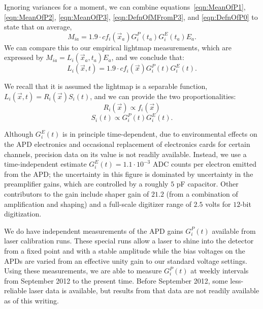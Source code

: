 Ignoring variances for a moment, we can combine equations~\ref{eqn:MeanOfP1}, \ref{eqn:MeanOfP2}, \ref{eqn:MeanOfP3}, \ref{eqn:DefnOfMFromP3}, and \ref{eqn:DefnOfP0} to state that on average,
\[M_{ia} = 1.9 \cdot c f_i(\vec{x}_a) G^P_i(t_a) G^E_i(t_a) E_a.\]
We can compare this to our empirical lightmap measurements, which are expressed by $M_{ia} = L_i(\vec{x}_a,t_a) E_a$,
and we conclude that:
\begin{equation}
L_i(\vec{x},t) = 1.9 \cdot c f_i(\vec{x}) G^P_i(t) G^E_i(t).
\end{equation}

We recall that it is assumed the lightmap is a separable function, $L_i(\vec{x},t) = R_i(\vec{x})S_i(t)$, and we can provide the two proportionalities:
\[ R_i(\vec{x}) \propto f_i(\vec{x}) \]
\[ S_i(t) \propto G^P_i(t) G^E_i(t).\]

Although $G^E_i(t)$ is in principle time-dependent, due to environmental effects on the APD electronics and occasional replacement of electronics cards for certain channels, precision data on its value is not readily available.  Instead, we use a time-independent estimate $G^E_i(t) = 1.1 \cdot 10^{-3}$ ADC counts per electron emitted from the APD; the uncertainty in this figure is dominated by uncertainty in the preamplifier gains, which are controlled by a roughly $5$ pF capacitor.  Other contributors to the gain include shaper gain of $21.2$ (from a combination of amplification and shaping) and a full-scale digitizer range of $2.5$ volts for $12$-bit digitization.

We do have independent measurements of the APD gains $G^P_i(t)$ available from laser calibration runs.  These special runs allow a laser to shine into the detector from a fixed point and with a stable amplitude while the bias voltages on the APDs are varied from an effective unity gain to our standard voltage settings.  Using these measurements, we are able to measure $G^P_i(t)$ at weekly intervals from September 2012 to the present time.  Before September 2012, some less-reliable laser data is available, but results from that data are not readily available as of this writing.

